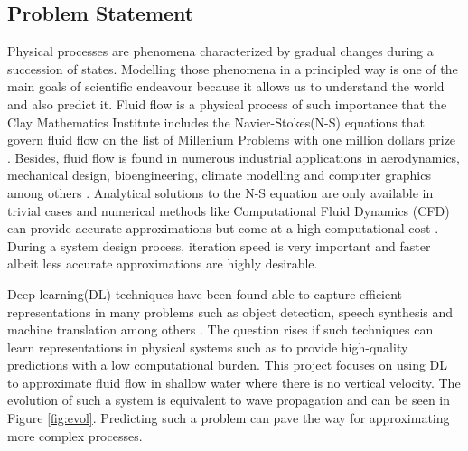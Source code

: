 \documentclass[a4paper,11pt]{article}
\begin{document}
\subsection{Problem Statement}
\vskip -2mm
Physical processes are phenomena characterized by gradual changes during a succession of states. Modelling those phenomena in a principled way is one of the main goals of scientific endeavour because it allows us to understand the world and also predict it. Fluid flow is a physical process of such importance that the Clay Mathematics Institute includes the Navier-Stokes(N-S) equations that govern fluid flow on the list of Millenium Problems with one million dollars prize \cite{clay}. Besides, fluid flow is found in numerous industrial applications in aerodynamics, mechanical design, bioengineering, climate modelling and computer graphics among others \cite{thuerey2018well}. Analytical solutions to the N-S equation are only available in trivial cases and numerical methods like Computational Fluid Dynamics (CFD) can provide accurate approximations but come at a high computational cost \cite{ferziger2012computationalcfd}. During a system design process, iteration speed is very important and faster albeit less accurate approximations are highly desirable. 

Deep learning(DL) techniques have been found able to capture efficient representations in many problems such as object detection, speech synthesis and machine translation among others \cite{lecun2015deep}. The question rises if such techniques can learn representations in physical systems such as to provide high-quality predictions with a low computational burden. This project focuses on using DL to approximate fluid flow in shallow water where there is no vertical velocity. The evolution of such a system is equivalent to wave propagation and can be seen in Figure \ref{fig:evol}. Predicting such a problem can pave the way for approximating more complex processes. 


\end{document}
